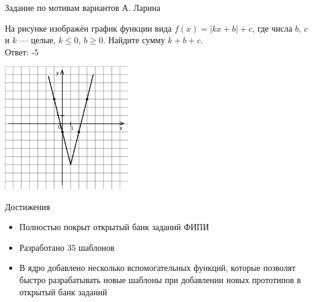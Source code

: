 \documentclass[aspectratio=169]{beamer}
\begin{document}
\begin{frame}{Задание по мотивам вариантов А. Ларина}

    \begin{multicols}{2}
        На рисунке изображён график функции вида $f(x)=|kx+b|+c$, где числа $b$, $c$ и $k$ — целые, $k \leq 0$, $b\geq0$. Найдите сумму $k+b+c$.\\

        Ответ: -5

        \includegraphics[width=0.4\textwidth]{images/453912618511153n0.png}
    
    \end{multicols}
    
        
    

\end{frame}


\begin{frame}{Достижения}
    \begin{itemize}
        \item Полностью покрыт открытый банк заданий ФИПИ
        \item Разработано 35 шаблонов
        \item В ядро добавлено несколько вспомогательных функций, которые позволят быстро разрабатывать новые шаблоны при добавлении новых прототипов в открытый банк заданий
    \end{itemize}
    
\end{frame}
\end{document}
